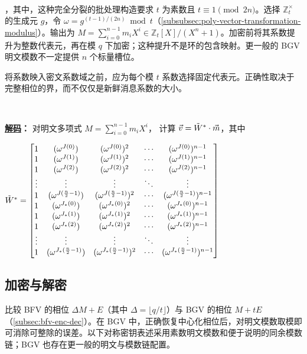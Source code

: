 \begin{tcolorbox}[title={\textbf{\tboxlabel{\ref*{subsec:bgv-encoding-decoding}} BGV 的编码与解码}}]
$ $

，其中，这种完全分裂的批处理构造要求 $t$ 为素数且 $t\equiv1\pmod{2n}$。选择 $\mathbb{Z}_t^\times$ 的生成元 $g$，令 $\omega=g^{(t-1)/(2n)}\bmod t$（\autoref{subsubsec:poly-vector-transformation-modulus}）。输出为 $M=\sum_{i=0}^{n-1}m_iX^i\in\mathbb{Z}_t[X]/(X^n+1)$。加密前将其系数提升为整数代表元，再在模 $q$ 下加密；这种提升不是环的包含映射。更一般的 BGV 明文模数不一定提供 $n$ 个标量槽位。

将系数映入密文系数域之前，应为每个模 $t$ 系数选择固定代表元。正确性取决于完整相位的界，而不仅仅是新鲜消息系数的大小。

$ $

\textbf{\underline{解码}：} 对明文多项式 $M = \sum\limits_{i=0}^{n-1} m_iX^i$，
计算 $\vec{v} = \tilde W^* \cdot \vec{m}$，其中

$\tilde{W}^* = \begin{bmatrix}
1 & (\omega^{J(0)}) & (\omega^{J(0)})^2 & \cdots & (\omega^{J(0)})^{n-1}\\
1 & (\omega^{J(1)}) & (\omega^{J(1)})^2 & \cdots & (\omega^{J(1)})^{n-1}\\
1 & (\omega^{J(2)}) & (\omega^{J(2)})^2 & \cdots & (\omega^{J(2)})^{n-1}\\
\vdots & \vdots & \vdots & \ddots & \vdots \\
1 & (\omega^{J(\frac{n}{2}-1)}) & (\omega^{J(\frac{n}{2}-1)})^2 & \cdots & (\omega^{J(\frac{n}{2}-1)})^{n-1}\\
1 & (\omega^{J_*(0)}) & (\omega^{J_*(0)})^2 & \cdots & (\omega^{J_*(0)})^{n-1}\\
1 & (\omega^{J_*(1)}) & (\omega^{J_*(1)})^2 & \cdots & (\omega^{J_*(1)})^{n-1}\\
1 & (\omega^{J_*(2)}) & (\omega^{J_*(2)})^2 & \cdots & (\omega^{J_*(2)})^{n-1}\\
\vdots & \vdots & \vdots & \ddots & \vdots \\
1 & (\omega^{J_*(\frac{n}{2}-1)}) & (\omega^{J_*(\frac{n}{2}-1)})^2 & \cdots & (\omega^{J_*(\frac{n}{2}-1)})^{n-1}\\
\end{bmatrix}$

\end{tcolorbox}


\subsection{加密与解密}
\label{subsec:bgv-enc-dec}

比较 BFV 的相位 $\Delta M+E$（其中 $\Delta=\lfloor q/t\rfloor$）与 BGV 的相位 $M+tE$（\autoref{subsec:bfv-enc-dec}）。在 BGV 中，正确恢复中心化相位后，对明文模数取模即可消除可整除的误差。以下对称密钥表述采用素数明文模数和便于说明的同余模数链；BGV 也存在更一般的明文与模数链配置。


